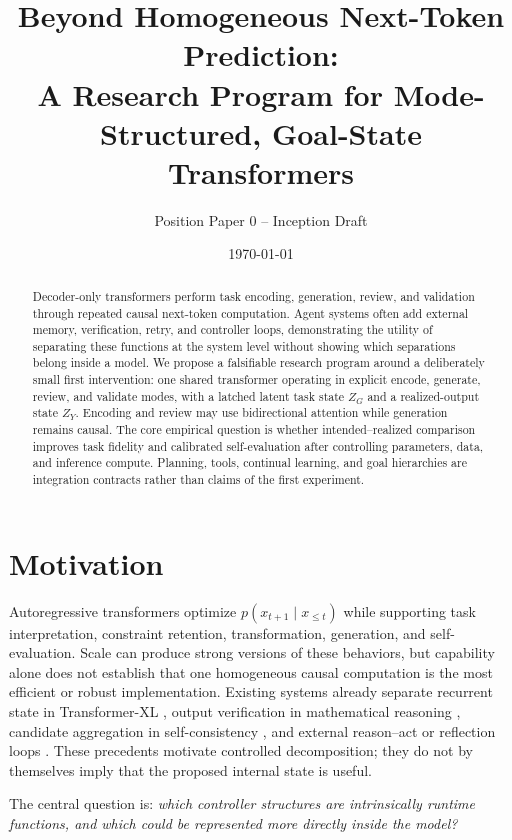 \documentclass[11pt]{article}
\title{Beyond Homogeneous Next-Token Prediction:\\A Research Program for Mode-Structured, Goal-State Transformers}
\author{Position Paper 0 -- Inception Draft}
\date{\today}
\begin{document}
\maketitle
\begin{abstract}
Decoder-only transformers perform task encoding, generation, review, and validation through repeated causal next-token computation. Agent systems often add external memory, verification, retry, and controller loops, demonstrating the utility of separating these functions at the system level without showing which separations belong inside a model. We propose a falsifiable research program around a deliberately small first intervention: one shared transformer operating in explicit encode, generate, review, and validate modes, with a latched latent task state $Z_G$ and a realized-output state $Z_Y$. Encoding and review may use bidirectional attention while generation remains causal. The core empirical question is whether intended--realized comparison improves task fidelity and calibrated self-evaluation after controlling parameters, data, and inference compute. Planning, tools, continual learning, and goal hierarchies are integration contracts rather than claims of the first experiment.
\end{abstract}

\section{Motivation}
Autoregressive transformers optimize $p(x_{t+1}\mid x_{\le t})$ while supporting task interpretation, constraint retention, transformation, generation, and self-evaluation. Scale can produce strong versions of these behaviors, but capability alone does not establish that one homogeneous causal computation is the most efficient or robust implementation. Existing systems already separate recurrent state in Transformer-XL \citep{dai2019transformerxl}, output verification in mathematical reasoning \citep{cobbe2021verifiers}, candidate aggregation in self-consistency \citep{wang2023selfconsistency}, and external reason--act or reflection loops \citep{yao2023react,shinn2023reflexion}. These precedents motivate controlled decomposition; they do not by themselves imply that the proposed internal state is useful.

The central question is: \emph{which controller structures are intrinsically runtime functions, and which could be represented more directly inside the model?}
\end{document}
